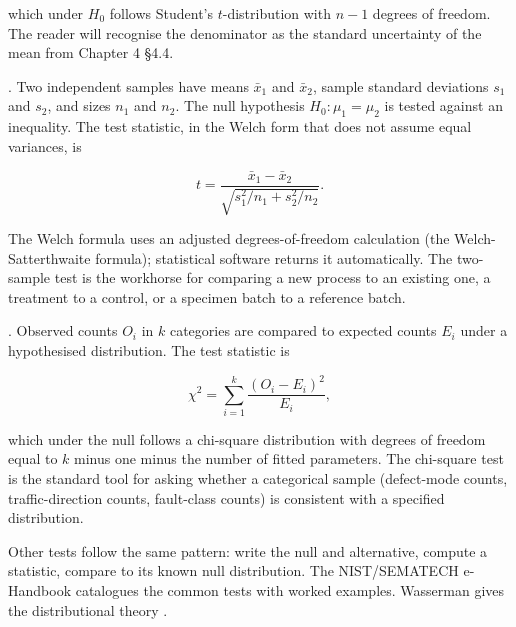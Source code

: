 which under $H_{0}$ follows Student's $t$-distribution with $n - 1$
degrees of freedom. The reader will recognise the denominator as the
standard uncertainty of the mean from Chapter 4 §4.4.

. Two independent samples have means
$\bar{x}_{1}$ and $\bar{x}_{2}$, sample standard deviations $s_{1}$
and $s_{2}$, and sizes $n_{1}$ and $n_{2}$. The null hypothesis
$H_{0}: \mu_{1} = \mu_{2}$ is tested against an inequality. The test
statistic, in the Welch form that does not assume equal variances,
is

\[
t = \frac{\bar{x}_{1} - \bar{x}_{2}}
{\sqrt{s_{1}^{2}/n_{1} + s_{2}^{2}/n_{2}}}.
\]

The Welch formula uses an adjusted degrees-of-freedom calculation
(the Welch-Satterthwaite formula); statistical software returns it
automatically. The two-sample test is the workhorse for comparing a
new process to an existing one, a treatment to a control, or a
specimen batch to a reference batch.

. Observed counts $O_{i}$ in
$k$ categories are compared to expected counts $E_{i}$ under a
hypothesised distribution. The test statistic is

\[
\chi^{2} = \sum_{i=1}^{k} \frac{(O_{i} - E_{i})^{2}}{E_{i}},
\]

which under the null follows a chi-square distribution with degrees
of freedom equal to $k$ minus one minus the number of fitted
parameters. The chi-square test is the standard tool for asking
whether a categorical sample (defect-mode counts, traffic-direction
counts, fault-class counts) is consistent with a specified
distribution.

Other tests follow the same pattern: write the null and alternative,
compute a statistic, compare to its known null distribution. The
NIST/SEMATECH e-Handbook \cite{web:nist-eshandbook} catalogues the
common tests with worked examples. Wasserman gives the
distributional theory \cite[ch.~10]{text:wasserman2004}.

